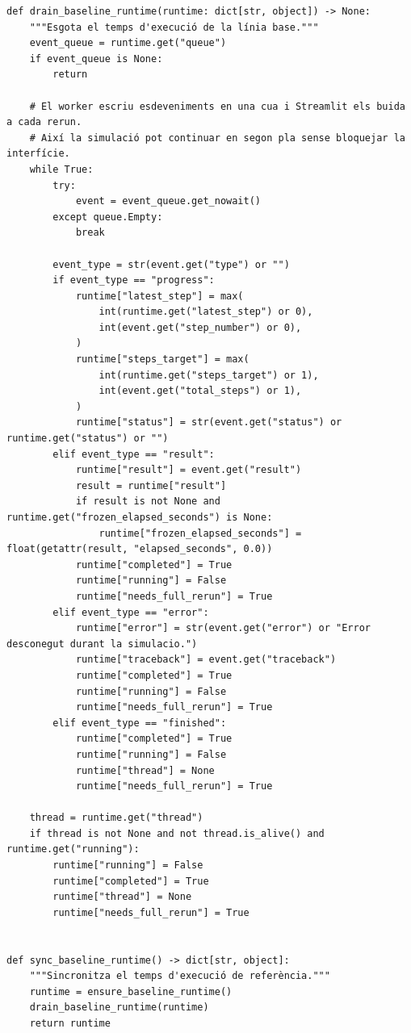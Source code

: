 \documentclass[10pt,a4paper]{article}
\begin{document}
\begin{lstlisting}[style=studioPython,caption={pages/Simular\_Entorn.py},label={lst:pages-simular-entorn-py}]
def drain_baseline_runtime(runtime: dict[str, object]) -> None:
    """Esgota el temps d'execució de la línia base."""
    event_queue = runtime.get("queue")
    if event_queue is None:
        return

    # El worker escriu esdeveniments en una cua i Streamlit els buida a cada rerun.
    # Així la simulació pot continuar en segon pla sense bloquejar la interfície.
    while True:
        try:
            event = event_queue.get_nowait()
        except queue.Empty:
            break

        event_type = str(event.get("type") or "")
        if event_type == "progress":
            runtime["latest_step"] = max(
                int(runtime.get("latest_step") or 0),
                int(event.get("step_number") or 0),
            )
            runtime["steps_target"] = max(
                int(runtime.get("steps_target") or 1),
                int(event.get("total_steps") or 1),
            )
            runtime["status"] = str(event.get("status") or runtime.get("status") or "")
        elif event_type == "result":
            runtime["result"] = event.get("result")
            result = runtime["result"]
            if result is not None and runtime.get("frozen_elapsed_seconds") is None:
                runtime["frozen_elapsed_seconds"] = float(getattr(result, "elapsed_seconds", 0.0))
            runtime["completed"] = True
            runtime["running"] = False
            runtime["needs_full_rerun"] = True
        elif event_type == "error":
            runtime["error"] = str(event.get("error") or "Error desconegut durant la simulacio.")
            runtime["traceback"] = event.get("traceback")
            runtime["completed"] = True
            runtime["running"] = False
            runtime["needs_full_rerun"] = True
        elif event_type == "finished":
            runtime["completed"] = True
            runtime["running"] = False
            runtime["thread"] = None
            runtime["needs_full_rerun"] = True

    thread = runtime.get("thread")
    if thread is not None and not thread.is_alive() and runtime.get("running"):
        runtime["running"] = False
        runtime["completed"] = True
        runtime["thread"] = None
        runtime["needs_full_rerun"] = True


def sync_baseline_runtime() -> dict[str, object]:
    """Sincronitza el temps d'execució de referència."""
    runtime = ensure_baseline_runtime()
    drain_baseline_runtime(runtime)
    return runtime



\end{lstlisting}
\end{document}
